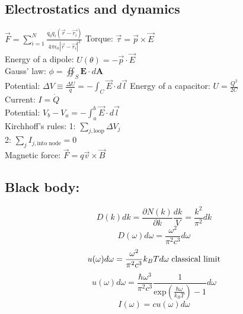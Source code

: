 \documentclass[12pt,a4paper]{article}
\begin{document}
	\subsection*{Electrostatics and dynamics}
	$\vec{F} = \sum_{i=1}^{N} \frac{q_0 q_i (\vec{r}-\vec{r_i})}{4\pi \epsilon_0 |\vec{r}-\vec{r_i}|^3}$
	Torque: $\vec{\tau} = \vec{p} \times \vec{E}$\\
	Energy of a dipole: $U(\theta) = -\vec{p} \cdot \vec{E}$\\
	Gauss' law: $ \phi = \oiint_{S} \textbf{E} \cdot d\textbf{A} $ \\
	Potential: $\Delta V \equiv \frac{\Delta U}{q} = - \int_{C} \vec{E} \cdot d\vec{l}$
	Energy of a capacitor: $U = \frac{Q^2}{2C}$\\
	Current: $I = \dot{Q}$\\
	Potential: $V_b - V_a = -\int_{a}^{b} \vec{E} \cdot d\vec{l}$\\
	Kirchhoff's rules: 1: $\sum_{j, \text{loop}} \Delta V_j$\\
	2: $\sum_{j} I_{j, \text{into node}} = 0$\\
	Magnetic force: $\vec{F} = q\vec{v} \times \vec{B}$\\
	
	\subsection*{Black body:}
	\begin{equation*}
		D(k) dk = \frac{\partial N(k)}{\partial k} \frac{dk}{V} = \frac{k^2}{\pi^2} dk
	\end{equation*}
	\begin{equation*}
		D(\omega) d\omega = \frac{\omega^2}{\pi^2 c^3} d\omega
	\end{equation*}
	\begin{equation*}
		u(\omega) d\omega = \frac{\omega^2}{\pi^2 c^3} k_B T d\omega \hspace*{3pt}\text{classical limit}
	\end{equation*}
		\begin{equation*}
		u(\omega) d\omega = \frac{\hbar \omega^3}{\pi^2 c^3} \frac{1}{\text{exp}(\frac{\hbar \omega}{k_B T})-1} d\omega
	\end{equation*}
	\begin{equation*}
		I(\omega) = c u(\omega) d\omega
	\end{equation*}
	
	
	
\end{document}
